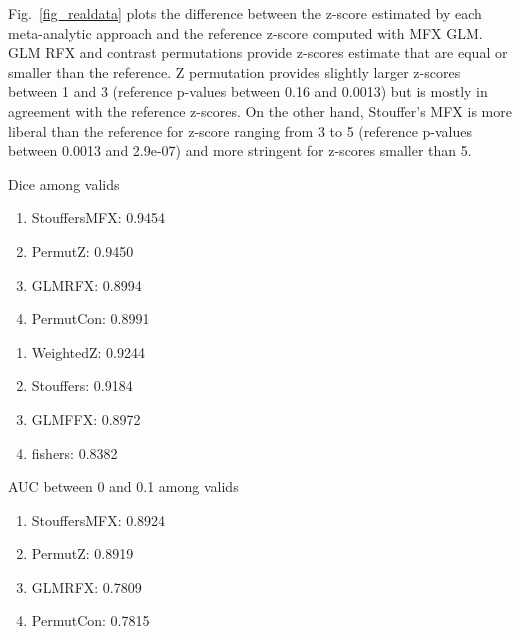 \documentclass{llncs}
\begin{document}
Fig.~\ref{fig_realdata} plots the difference between the z-score estimated by each meta-analytic approach and the reference z-score computed with MFX GLM. GLM RFX and contrast permutations provide z-scores estimate that are equal or smaller than the reference. Z permutation provides slightly larger z-scores between 1 and 3 (reference p-values between 0.16 and 0.0013) but is mostly in agreement with the reference z-scores. On the other hand, Stouffer's MFX is more liberal than the reference for z-score ranging from 3 to 5 (reference p-values between 0.0013 and 2.9e-07) and more stringent for z-scores smaller than 5.


Dice among valids
\begin{enumerate}
\item StouffersMFX: 0.9454
\item PermutZ: 0.9450
\item GLMRFX: 0.8994
\item PermutCon: 0.8991
\end{enumerate}

\begin{enumerate}
\item WeightedZ: 0.9244
\item Stouffers: 0.9184
\item GLMFFX: 0.8972
\item fishers: 0.8382
\end{enumerate}

AUC between 0 and 0.1
among valids
\begin{enumerate}
\item StouffersMFX: 0.8924
\item PermutZ: 0.8919
\item GLMRFX: 0.7809
\item PermutCon: 0.7815
\end{enumerate}
\end{document}
